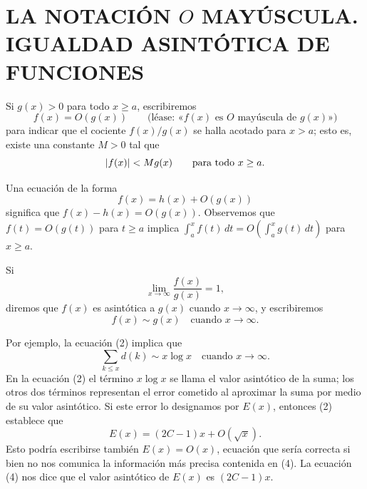 \documentclass[12pt,a4paper]{book}
\begin{document}
    \section{LA NOTACIÓN \texorpdfstring{$O$}{O} MAYÚSCULA. IGUALDAD ASINTÓTICA DE FUNCIONES}

    \begin{definicion}[O mayúscula]
        Si $g(x)>0$ para todo $x\geq a$, escribiremos
        \begin{equation*}
            f(x)=O(g(x))\qquad\text{(léase: «$f(x)$ es $O$ mayúscula de $g(x)$»)}
        \end{equation*}
        para indicar que el cociente $f(x)/g(x)$ se halla acotado para $x>a$; esto es,
        existe una constante $M>0$ tal que
        \begin{equation*}
            \abs{f(x)}<Mg(x)\qquad\text{para todo } x\geq a.
        \end{equation*}
    \end{definicion}

    Una ecuación de la forma
    \begin{equation*}
        f(x)=h(x)+O(g(x))
    \end{equation*}
    significa que $f(x)-h(x)=O(g(x))$. Observemos que $f(t)=O(g(t))$ para $t\geq a$ implica
    $\int_a^x f(t)\,dt=O\left(\int_a^x g(t)\,dt\right)$ para $x\geq a$.

    \begin{definicion}
        Si
        \begin{equation*}
            \lim_{x\to\infty}\frac{f(x)}{g(x)}=1,
        \end{equation*}
        diremos que $f(x)$ es asintótica a $g(x)$ cuando $x\to\infty$, y escribiremos
        \begin{equation*}
            f(x)\sim g(x)\quad\text{cuando } x\to\infty.
        \end{equation*}
    \end{definicion}

    Por ejemplo, la ecuación (2) implica que
    \begin{equation*}
        \sum_{k\leq x}d(k)\sim x\log x\quad\text{cuando } x\to\infty.
    \end{equation*}
    En la ecuación (2) el término $x\log x$ se llama el valor asintótico de la suma; los
    otros dos términos representan el error cometido al aproximar la suma por medio de su
    valor asintótico. Si este error lo designamos por $E(x)$, entonces (2) establece que
    \begin{equation}
        E(x)=(2C-1)x+O(\sqrt x).
    \end{equation}
    Esto podría escribirse también $E(x)=O(x)$, ecuación que sería correcta si bien no nos
    comunica la información más precisa contenida en (4). La ecuación (4) nos dice que el
    valor asintótico de $E(x)$ es $(2C-1)x$.
\end{document}
